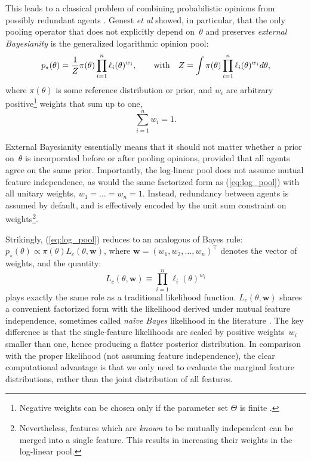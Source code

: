 \documentclass[english]{scrartcl}
\begin{document}
This leads to a classical problem of combining probabilistic opinions from possibly redundant agents \cite{Tarantola-82,Genest-86,Garg-04,Allard-12}. Genest {\em et al} \cite{Genest-86b} showed, in particular, that the only pooling operator that does not explicitly depend on~$\theta$ and preserves {\em external Bayesianity} is the generalized logarithmic opinion pool:
\begin{equation}
\label{eq:log_pool}
p_\star(\theta) = \frac{1}{Z} \pi(\theta) \prod_{i=1}^n \ell_i (\theta)^{w_i},
\qquad
{\rm with}\quad 
Z = \int \pi(\theta) \prod_{i=1}^n \ell_i (\theta)^{w_i} d\theta,
\end{equation} 
where $\pi(\theta)$ is some reference distribution or prior, and $w_i$ are arbitrary positive\footnote{Negative weights can be chosen only if the parameter set $\Theta$ is finite \cite{Genest-86b}.} weights that sum up to one,
$$
\sum_{i=1}^n w_i = 1
.
$$

External Bayesianity essentially means that it should not matter whether a prior on~$\theta$ is incorporated before or after pooling opinions, provided that all agents agree on the same prior. Importantly, the log-linear pool does not assume mutual feature independence, as would the same factorized form as (\ref{eq:log_pool}) with all unitary weights, $w_1=\ldots=w_n= 1$. Instead, redundancy between agents is assumed by default, and is effectively encoded by the unit sum constraint on weights\footnote{Nevertheless, features which are {\em known} to be mutually independent can be merged into a single feature. This results in increasing their weights in the log-linear pool.}.

Strikingly, (\ref{eq:log_pool}) reduces to an analogous of Bayes rule: $p_\star(\theta)\propto \pi(\theta) L_c(\theta,\mathbf{w})$, where $\mathbf{w}=(w_1,w_2,\ldots,w_n)^\top$ denotes the vector of weights, and the quantity:
\begin{equation}
\label{eq:comp_lik}
L_c(\theta,\mathbf{w}) \equiv \prod_{i=1}^n \ell_i (\theta)^{w_i}
\end{equation} 
plays exactly the same role as a traditional likelihood function. $L_c(\theta,\mathbf{w})$ shares a convenient factorized form with the likelihood derived under mutual feature independence, sometimes called {\em na\"ive Bayes} likelihood in the literature \cite{Ng-01}. The key difference is that the single-feature likelihoods are scaled by positive weights~$w_i$ smaller than one, hence producing a flatter posterior distribution. In comparison with the proper likelihood (not assuming feature independence), the clear computational advantage is that we only need to evaluate the marginal feature distributions, rather than the joint distribution of all features. 
\end{document}
